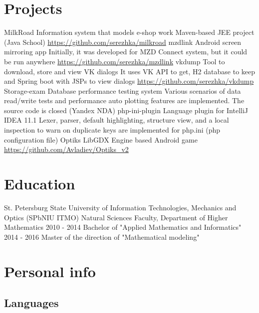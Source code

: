\documentclass[11pt,a4paper,russian]{moderncv}
\begin{document}
\newpage

\section{Projects}
\cvline
    {MilkRoad}
    {Information system that models e-shop work \newline
    Maven-based JEE project (Java School) \newline
    \url{https://github.com/serezhka/milkroad}}
\cvline
    {mzdlink}
    {Android screen mirroring app \newline
    Initially, it was developed for MZD Connect system, but it could be run anywhere \newline
    \url{https://github.com/serezhka/mzdlink}}
\cvline
    {vkdump}
    {Tool to download, store and view VK dialogs \newline
    It uses VK API to get, H2 database to keep and Spring boot with JSPs to view dialogs \newline
    \url{https://github.com/serezhka/vkdump}}
\cvline
    {Storage-exam}
    {Database performance testing system \newline 
    Various scenarios of data read/write tests and performance auto plotting  \newline
    features are implemented. The source code is closed (Yandex NDA)}
\cvline
    {php-ini-plugin}
    {Language plugin for IntelliJ IDEA 11.1 \newline
    Lexer, parser, default highlighting, structure view, and a local inspection to warn on duplicate keys are implemented for php.ini (php configuration file)}  
\cvline
    {Optiks}
    {LibGDX Engine based Android game\newline
    \url{https://github.com/Avladiev/Optiks_v2}}
  
\section{Education}
\cventry
    {}{\textnormal{St. Petersburg State University of Information Technologies, Mechanics and Optics (SPbNIU ITMO)}}
    {Natural Sciences Faculty, Department of Higher Mathematics}{}{}{}
\cvline
    {2010 - 2014}
    {Bachelor of "Applied Mathematics and Informatics"}
\cvline
    {2014 - 2016}
    {Master of the direction of "Mathematical modeling"}

\section{Personal info}

\subsection{Languages}
\end{document}

